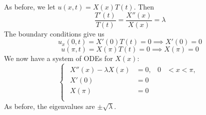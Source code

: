 \documentclass[plain]{pset}
\begin{document}
\begin{solution}
    As before, we let \(u(x, t) = X(x)T(t)\). Then
    \[\frac{T'(t)}{T(t)} = \frac{X''(x)}{X(x)} = \lambda\]
    The boundary conditions give us
    \[u_x(0, t) = X'(0)T(t) = 0 \implies X'(0) = 0\]
    \[u(\pi, t) = X(\pi)T(t) = 0 \implies X(\pi) = 0\]
    We now have a system of ODEs for \(X(x)\):
    \[
        \begin{cases}
            \begin{aligned}
                X''(x) - \lambda X(x) & = 0, & 0 & < x < \pi, \\
                X'(0)                 & = 0  &   &            \\
                X(\pi)                & = 0  &   &            \\
            \end{aligned}
        \end{cases}
    \]
    As before, the eigenvalues are \(\pm\sqrt{\lambda}\).


\end{solution}
\end{document}
